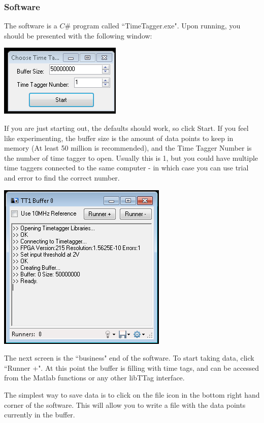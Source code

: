 \documentclass[10pt]{article}
\begin{document}
\subsubsection{Software}
The software is a $C\#$ program called ``TimeTagger.exe". Upon running, you should be presented with the
following window:

\begin{center}
\includegraphics{uqd_setup.png}
\end{center}

If you are just starting out, the defaults should work, so click Start. If you feel like experimenting,
the buffer size is the amount of data points to keep in memory (At least 50 million is recommended), and
the Time Tagger Number is the number of time tagger to open. Usually this is 1, but you could have multiple
time taggers connected to the same computer - in which case you can use trial and error to
find the correct number.

\begin{center}
\includegraphics{uqd_main.png}
\end{center}

The next screen is the ``business" end of the software. To start taking data, click ``Runner +". At this point
the buffer is filling with time tags, and can be accessed from the Matlab functions or any other libTTag interface.

The simplest way to save data is to click on the file icon in the bottom right hand corner of the software. This
will allow you to write a file with the data points currently in the buffer.
\end{document}
